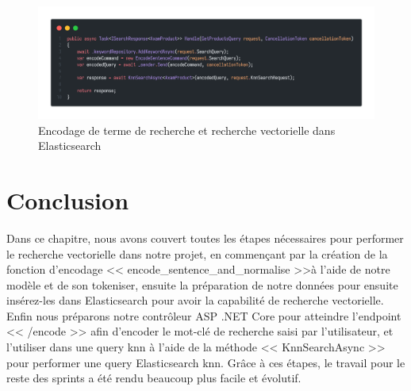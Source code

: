 \begin{figure}[H]
	\centering
	\includegraphics[width=1\textwidth]{logos/returnencodedvector.png}
	\caption{Encodage de terme de recherche et recherche vectorielle dans Elasticsearch}
	\label{fig:returnencodedvector}
\end{figure}


\newpage
\section{Conclusion}
\noindent
Dans ce chapitre, nous avons couvert toutes les étapes nécessaires pour performer le recherche vectorielle dans notre projet, en commençant par la création de la fonction d'encodage << encode\_sentence\_and\_normalise >>à l'aide de notre modèle et de son tokeniser, ensuite la préparation de notre données pour ensuite insérez-les dans Elasticsearch pour avoir la capabilité de recherche vectorielle. Enfin nous préparons notre contrôleur ASP .NET Core pour atteindre l'endpoint << /encode >> afin d'encoder le mot-clé de recherche saisi par l'utilisateur, et l'utiliser dans une query knn à l'aide de la méthode << KnnSearchAsync >> pour performer une query Elasticsearch knn.
Grâce à ces étapes, le travail pour le reste des sprints a été rendu beaucoup plus facile et évolutif.